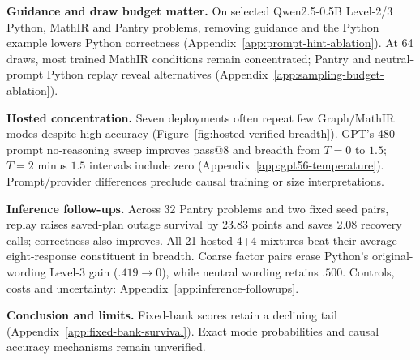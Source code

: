 \noindent\textbf{Guidance and draw budget matter.}
On selected Qwen2.5-0.5B Level-2/3 Python, MathIR and Pantry problems,
removing guidance and the Python example lowers Python correctness (Appendix~\ref{app:prompt-hint-ablation}).
At 64 draws, most trained MathIR conditions remain concentrated; Pantry and
neutral-prompt Python replay reveal alternatives (Appendix~\ref{app:sampling-budget-ablation}).

\noindent\textbf{Hosted concentration.}
\label{sec:hosted-concentration}
Seven deployments often repeat few Graph/MathIR modes despite high accuracy
(Figure~\ref{fig:hosted-verified-breadth}). GPT's 480-prompt no-reasoning sweep
improves pass@8 and breadth from $T=0$ to $1.5$; $T=2$ minus $1.5$ intervals
include zero (Appendix~\ref{app:gpt56-temperature}). Prompt/provider differences
preclude causal training or size interpretations.

\noindent\textbf{Inference follow-ups.}
Across 32 Pantry problems and two fixed seed pairs, replay raises saved-plan
outage survival by 23.83 points and saves 2.08 recovery calls; correctness also
improves. All 21 hosted 4+4 mixtures beat their average eight-response
constituent in breadth. Coarse factor pairs erase Python's original-wording
Level-3 gain ($.419\to0$), while neutral wording retains $.500$.
Controls, costs and uncertainty: Appendix~\ref{app:inference-followups}.

\noindent\textbf{Conclusion and limits.}
\label{sec:conclusion}\label{sec:discussion}\label{sec:limitations}
Fixed-bank scores retain a declining tail (Appendix~\ref{app:fixed-bank-survival}).
Exact mode probabilities and causal accuracy mechanisms remain unverified.

\label{main:lastpage}

\clearpage


\clearpage
\appendix


